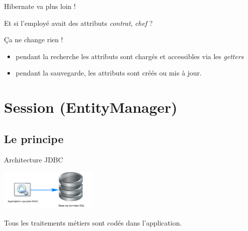 \documentclass[compress]{beamer}%
\begin{document}
\begin{frame}{Hibernate va plus loin !}
	
	\begin{block}{}
	\center
	Et si l'employé avait des attributs \emph{contrat}, \emph{chef} ?
	\end{block}
	
	\pause
	Ça ne change rien !
	\begin{itemize}
	\item pendant la recherche les attributs sont chargés et accessibles via les \emph{getters}
	\item pendant la sauvegarde, les attributs sont créés ou mis à jour.
	\end{itemize}
	
\end{frame}
	
\section{Session (EntityManager)}

\subsection{Le principe}

\begin{frame}{Architecture JDBC}
	
	\begin{center}
	\includegraphics[height=2cm]{images/without_orm.png}	
	\end{center}
	
	\begin{block}{}
	\center
	Tous les traitements métiers sont codés dans l'application.
	\end{block}
\end{frame}
	
\end{document}
